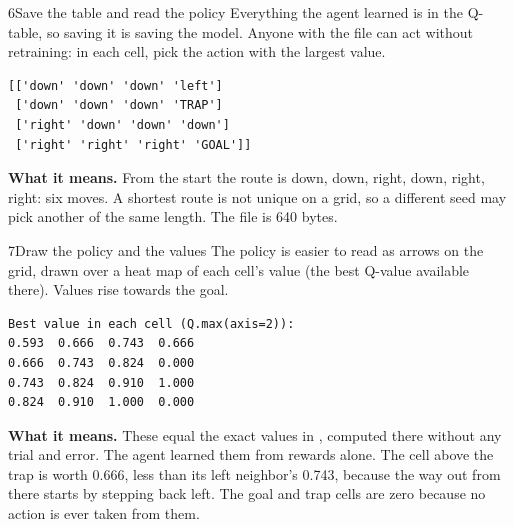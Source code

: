 
\begin{labquestion}{6}{Save the table and read the policy}
Everything the agent learned is in the Q-table, so saving it is saving the model. Anyone with the file can act without retraining: in each cell, pick the action with the largest value.
\end{labquestion}
\begin{labanswer}

\begin{refoutput}
\begin{lstlisting}[style=utpterminal]
[['down' 'down' 'down' 'left']
 ['down' 'down' 'down' 'TRAP']
 ['right' 'down' 'down' 'down']
 ['right' 'right' 'right' 'GOAL']]
\end{lstlisting}
\end{refoutput}

\textbf{What it means.} From the start the route is down, down, right, down, right, right: six moves. A shortest route is not unique on a grid, so a different seed may pick another of the same length. The file is 640 bytes.
\end{labanswer}

\begin{labquestion}{7}{Draw the policy and the values}
The policy is easier to read as arrows on the grid, drawn over a heat map of each cell's value (the best Q-value available there). Values rise towards the goal.
\end{labquestion}
\begin{labanswer}

\begin{refoutput}
\begin{lstlisting}[style=utpterminal]
Best value in each cell (Q.max(axis=2)):
0.593  0.666  0.743  0.666
0.666  0.743  0.824  0.000
0.743  0.824  0.910  1.000
0.824  0.910  1.000  0.000
\end{lstlisting}
\end{refoutput}

\textbf{What it means.} These equal the exact values in , computed there without any trial and error. The agent learned them from rewards alone. The cell above the trap is worth 0.666, less than its left neighbor's 0.743, because the way out from there starts by stepping back left. The goal and trap cells are zero because no action is ever taken from them.
\end{labanswer}

